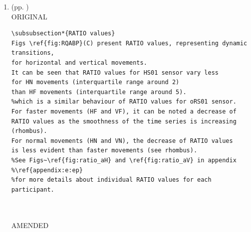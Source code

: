 \documentclass[10pt]{article}
\begin{document}
\begin{enumerate}
\begin{verbatim}
\subsubsection*{DET values}
Figs \ref{fig:RQABP}(B) illustrate DET values 
that represent the predictability and organisation of RPs.
Generally, it can be noted little change of DET values 
(interquartile range is around 0.1) 
for type of movement, type of sensor 
but the increase of DET values as the smoothness of 
the signal increase 
(see the incremental changes of mean values (rhombus)).
However, the interquartile range for faster movements
(HF and VF) with no smoothing (sg0) is lower than the other
levels of smoothness (sg1 and sg2).
%See Figs~\ref{fig:det_aH} and \ref{fig:det_aV} in appendix \ref{appendix:e:ep} 
%for more details about individual DET values for each participant.


\end{verbatim}

\textit{
LOG: \\ 
Mon 13 Apr 17:28:11 BST 2020
}
\\





\item  (pp. ) \\
ORIGINAL
\begin{verbatim}
\subsubsection*{RATIO values}
Figs \ref{fig:RQABP}(C) present RATIO values, representing dynamic transitions, 
for horizontal and vertical movements.
It can be seen that RATIO values for HS01 sensor vary less 
for HN movements (interquartile range around 2)
than HF movements (interquartile range around 5).
%which is a similar behaviour of RATIO values for oRS01 sensor.
For faster movements (HF and VF), it can be noted a decrease of 
RATIO values as the smoothness of the time series is increasing (rhombus).
For normal movements (HN and VN), the decrease of RATIO values
is less evident than faster movements (see rhombus).
%See Figs~\ref{fig:ratio_aH} and \ref{fig:ratio_aV} in appendix 
%\ref{appendix:e:ep} 
%for more details about individual RATIO values for each participant.



\end{verbatim}

AMENDED
\begin{verbatim}


\end{verbatim}
\end{enumerate}
\end{document}
